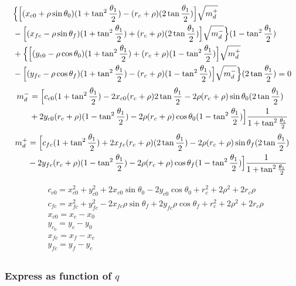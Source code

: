 \documentclass[12pt]{article}
\begin{document}
\begin{align*}
    &\Bigl\{\Bigl[(x_{c0} + \rho\sin\theta_0)(1 + \tan^2\frac{\theta_1}{2}) - (r_c+\rho)(2\tan\frac{\theta_1}{2}) \Bigr]\sqrt{m_d^+}\\
    &- \Bigl[ (x_{fc} - \rho\sin\theta_f)(1 + \tan^2\frac{\theta_1}{2}) + (r_c+\rho)(2\tan\frac{\theta_1}{2})\Bigr]\sqrt{m_d^-}\Bigr\}(1-\tan^2\frac{\theta_1}{2}) \\
    & + \Bigl\{\Bigl[ (y_{c0} - \rho\cos\theta_0)(1 + \tan^2\frac{\theta_1}{2}) + (r_c + \rho)(1-\tan^2\frac{\theta_1}{2}) \Bigr]\sqrt{m_d^+}\\
    &- \Bigl[ (y_{fc} - \rho\cos\theta_f)(1 + \tan^2\frac{\theta_1}{2}) - (r_c+\rho)(1-\tan^2\frac{\theta_1}{2}) \Bigr]\sqrt{m_d^-} \Bigr\}(2\tan\frac{\theta_1}{2}) = 0
\end{align*}
\begin{align*}
    m_d^- &= \Bigl[ c_{c0}(1 + \tan^2\frac{\theta_1}{2}) - 2x_{c0}(r_c+\rho)2\tan\frac{\theta_1}{2} - 2\rho(r_c+\rho)\sin\theta_0(2\tan\frac{\theta_1}{2})\\
    &+ 2y_{c0}(r_c+\rho)(1-\tan^2\frac{\theta_1}{2}) - 2\rho(r_c+\rho)\cos\theta_0(1 - \tan^2\frac{\theta_1}{2}) \Bigr] \frac{1}{1+\tan^2\frac{\theta_1}{2}}
\end{align*}
\begin{align*}
    m_d^+ &= \Bigl[c_{fc}(1 + \tan^2\frac{\theta_1}{2}) + 2x_{fc}(r_c+\rho)(2\tan\frac{\theta_1}{2}) - 2\rho(r_c+\rho)\sin\theta_f(2\tan\frac{\theta_1}{2})\\
    &- 2y_{fc}(r_c+\rho)(1 - \tan^2\frac{\theta_1}{2}) - 2\rho(r_c+\rho)\cos\theta_f(1 - \tan^2\frac{\theta_1}{2}) \Bigr] \frac{1}{1+\tan^2\frac{\theta_1}{2}}
\end{align*}


\begin{align*}
    &c_{c0} = x_{c0}^2 + y_{c0}^2 + 2x_{c0}\sin\theta_0 - 2y_{c0}\cos\theta_0 + r_c^2 + 2\rho^2 + 2r_c\rho\\
    &c_{fc} = x_{fc}^2 + y_{fc}^2 - 2x_{fc}\rho\sin\theta_f + 2y_{fc}\rho\cos\theta_f + r_c^2 + 2\rho^2 + 2r_c\rho\\
    &x_{c0} = x_c - x_0\\
    &y_{c_0} = y_c - y_0\\
    &x_{fc} = x_f - x_c\\
    &y_{fc} = y_f - y_c\\
\end{align*}

\subsubsection*{Express as function of $q$}
\end{document}
